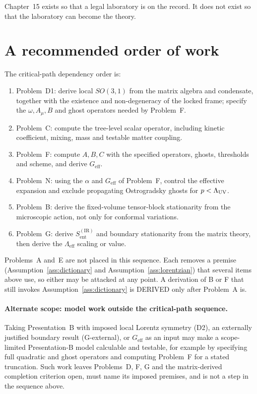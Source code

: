 Chapter~15 exists so that a legal laboratory is on the record.
It does not exist so that the laboratory can become the theory.

\section{A recommended order of work}
\label{sec:ch17-order}

The critical-path dependency order is:

\begin{enumerate}
  \item Problem~D1: derive local \(SO(3,1)\) from the matrix algebra
        and condensate, together with the existence and
        non-degeneracy of the locked frame; specify the
        \(\omega,A_\mu,B\) and ghost operators needed by Problem~F.
  \item Problem~C: compute the tree-level scalar operator, including
        kinetic coefficient, mixing, mass and testable matter coupling.
  \item Problem~F: compute \(A,B,C\) with the specified operators,
        ghosts, thresholds and scheme, and derive \(G_{\mathrm{eff}}\).
  \item Problem~N: using the \(\alpha\) and \(G_{\mathrm{eff}}\) of
        Problem~F, control the effective expansion and exclude
        propagating Ostrogradsky ghosts for \(p<\Lambda_{\mathrm{UV}}\).
  \item Problem~B: derive the fixed-volume tensor-block stationarity
        from the microscopic action, not only for conformal variations.
  \item Problem~G: derive \(S_{\mathrm{ent}}^{\mathrm{(IR)}}\) and
        boundary stationarity from the matrix theory, then derive the
        \(\Lambda_{\mathrm{eff}}\) scaling or value.
\end{enumerate}

Problems~A and~E are not placed in this sequence. Each removes a
premise (Assumption~\ref{ass:dictionary} and
Assumption~\ref{ass:lorentzian}) that several items above use, so
either may be attacked at any point. A derivation of B or F that
still invokes Assumption~\ref{ass:dictionary} is DERIVED only after
Problem~A is.

\paragraph{Alternate scope: model work outside the critical-path sequence.}
Taking Presentation~B with imposed local Lorentz symmetry (D2), an
externally justified boundary result (G-external), or \(G_{\mathrm{eff}}\)
as an input may make a scope-limited Presentation-B model calculable
and testable, for example by specifying full quadratic and ghost
operators and computing Problem~F for a stated truncation. Such work
leaves Problems~D, F, G and the matrix-derived completion criterion
open, must name its imposed premises, and is not a step in the
sequence above.


